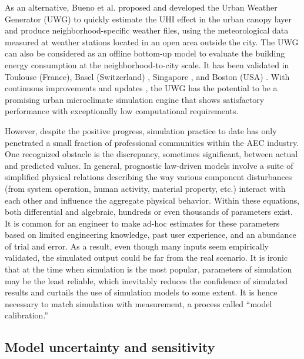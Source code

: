 As an alternative, Bueno et al. \cite{bueno2013urban} proposed and developed the Urban Weather Generator (UWG) to quickly estimate the UHI effect in the urban canopy layer and produce neighborhood-specific weather files, using the meteorological data measured at weather stations located in an open area outside the city. The UWG can also be considered as an offline bottom-up model to evaluate the building energy consumption at the neighborhood-to-city scale. It has been validated in Toulouse (France), Basel (Switzerland) \cite{bueno2013urban}, Singapore \cite{bueno2014computationally}, and Boston (USA) \cite{nakano2015urban}. With continuous improvements and updates \cite{yang2016curious}, the UWG has the potential to be a promising urban microclimate simulation engine that shows satisfactory performance with exceptionally low computational requirements.

However, despite the positive progress, simulation practice to date has only penetrated a small fraction of professional communities within the AEC industry. One recognized obstacle is the discrepancy, sometimes significant, between actual and predicted values. In general, prognostic law-driven models \cite{saltelli2008global} involve a suite of simplified physical relations describing the way various component disturbances (from system operation, human activity, material property, etc.) interact with each other and influence the aggregate physical behavior. Within these equations, both differential and algebraic, hundreds or even thousands of parameters exist. It is common for an engineer to make ad-hoc estimates for these parameters based on limited engineering knowledge, past user experience, and an abundance of trial and error. As a result, even though many inputs seem empirically validated, the simulated output could be far from the real scenario. It is ironic that at the time when simulation is the most popular, parameters of simulation may be the least reliable, which inevitably reduces the confidence of simulated results and curtails the use of simulation models to some extent. It is hence necessary to match simulation with measurement, a process called ``model calibration.''

\subsection{Model uncertainty and sensitivity}

